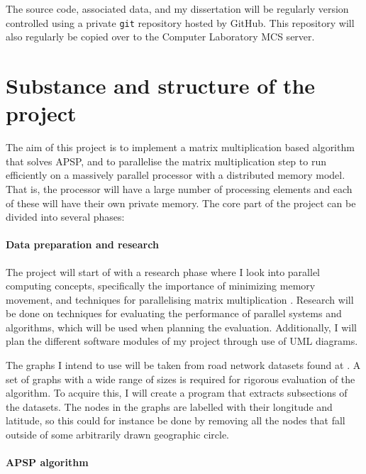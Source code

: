 \documentclass[../dissertation/diss.tex]{subfiles}
\begin{document}
The source code, associated data, and my dissertation will be regularly version controlled
using a private \texttt{git} repository hosted by GitHub. This repository will also regularly
be copied over to the Computer Laboratory MCS server.

\section*{Substance and structure of the project}%
\label{sec:Substance and Structure of the Project}

The aim of this project is to implement a matrix multiplication based algorithm that solves
APSP, and to parallelise the matrix multiplication step to run
efficiently on a massively parallel processor with a distributed memory model. That is, the processor
will have a large number of processing elements and each of these will have their own private memory.
The core part of the project can be divided into several phases:

\paragraph{Data preparation and research}%
\label{par:Preparation research}

The project will start of with a research phase where I look into parallel
computing concepts, specifically the importance of minimizing memory movement,
and techniques for parallelising matrix multiplication \cite{cannon, fox}.
Research will be done on techniques for evaluating the performance of parallel
systems and algorithms, which will be used when planning the evaluation.
Additionally, I will plan the different software modules of my project through
use of UML diagrams.

The graphs I intend to use will be taken from road network datasets found at
\cite{road-data}. A set of graphs with a wide range of sizes is required for
rigorous evaluation of the algorithm. To acquire this, I will create a program
that extracts subsections of the datasets. The nodes in the graphs are labelled
with their longitude and latitude, so this could for instance be done by
removing all the nodes that fall outside of some arbitrarily drawn geographic circle.

\paragraph{APSP algorithm}%
\label{par:APSP Algorithm}
\end{document}
